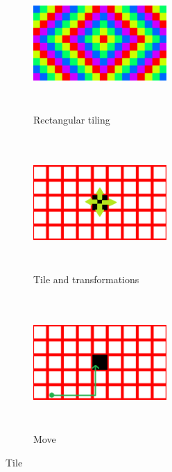 \begin{figure}[h!tbp]
   \begin{subfigure}{0.3\textwidth}
   \begin{center}
    \includegraphics[width=2in, height=2in, keepaspectratio]{../img/tessellation/rectTile.pdf}
    \caption{Rectangular tiling}
    \label{fig:rectTile}
   \end{center}
  \end{subfigure}
 \hspace*{\fill}
   \begin{subfigure}{0.3\textwidth}
   \begin{center}
    \includegraphics[width=2in, height=2in, keepaspectratio]{../img/tessellation/tile.pdf}
    \caption{Tile and transformations}
    \label{fig:tile}
   \end{center}
  \end{subfigure}
 \hspace*{\fill}
 \begin{subfigure}{0.3\textwidth}
  \begin{center}
   \includegraphics[width=2in, height=2in, keepaspectratio]{../img/tessellation/tileMove.pdf}
   \caption{Move}
   \label{fig:tileMove}
  \end{center}
 \end{subfigure}
 \hspace*{\fill}
\caption{Tile}
\end{figure}

